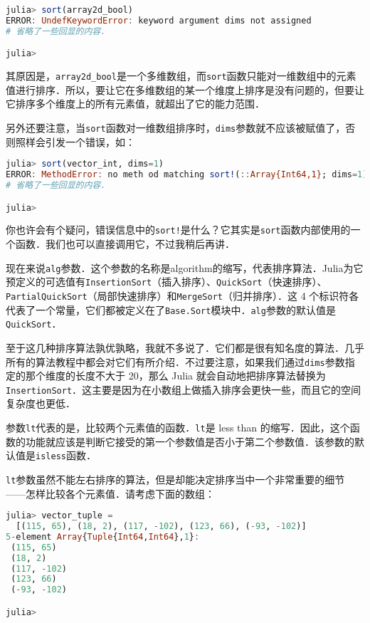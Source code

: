 \begin{lstlisting}[language=julia]
julia> sort(array2d_bool)
ERROR: UndefKeywordError: keyword argument dims not assigned
# 省略了一些回显的内容．

julia> 
\end{lstlisting}

其原因是，\verb|array2d_bool|是一个多维数组，而\verb|sort|函数只能对一维数组中的元素值进行排序．所以，要让它在多维数组的某一个维度上排序是没有问题的，但要让它排序多个维度上的所有元素值，就超出了它的能力范围．

另外还要注意，当\verb|sort|函数对一维数组排序时，\verb|dims|参数就不应该被赋值了，否则照样会引发一个错误，如：

\begin{lstlisting}[language=julia]
julia> sort(vector_int, dims=1)
ERROR: MethodError: no meth od matching sort!(::Array{Int64,1}; dims=1)
# 省略了一些回显的内容．

julia> 
\end{lstlisting}

你也许会有个疑问，错误信息中的\verb|sort!|是什么？它其实是\verb|sort|函数内部使用的一个函数．我们也可以直接调用它，不过我稍后再讲．

现在来说\verb|alg|参数．这个参数的名称是algorithm的缩写，代表排序算法．Julia为它预定义的可选值有\verb|InsertionSort|（插入排序）、\verb|QuickSort|（快速排序）、\verb|PartialQuickSort|（局部快速排序）和\verb|MergeSort|（归并排序）．这 4 个标识符各代表了一个常量，它们都被定义在了\verb|Base.Sort|模块中．\verb|alg|参数的默认值是\verb|QuickSort|．

至于这几种排序算法孰优孰略，我就不多说了．它们都是很有知名度的算法．几乎所有的算法教程中都会对它们有所介绍．不过要注意，如果我们通过\verb|dims|参数指定的那个维度的长度不大于 20，那么 Julia 就会自动地把排序算法替换为\verb|InsertionSort|．这主要是因为在小数组上做插入排序会更快一些，而且它的空间复杂度也更低．

参数\verb|lt|代表的是，比较两个元素值的函数．\verb|lt|是 less than 的缩写．因此，这个函数的功能就应该是判断它接受的第一个参数值是否小于第二个参数值．该参数的默认值是\verb|isless|函数．

\verb|lt|参数虽然不能左右排序的算法，但是却能决定排序当中一个非常重要的细节——怎样比较各个元素值．请考虑下面的数组：

\begin{lstlisting}[language=julia]
julia> vector_tuple = 
  [(115, 65), (18, 2), (117, -102), (123, 66), (-93, -102)]
5-element Array{Tuple{Int64,Int64},1}:
 (115, 65)  
 (18, 2)    
 (117, -102)
 (123, 66)  
 (-93, -102)

julia> 
\end{lstlisting}

